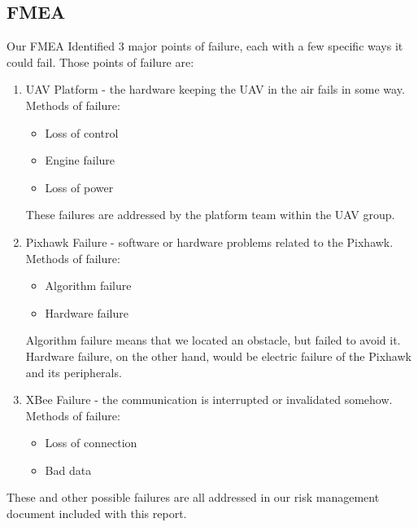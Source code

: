 \documentclass[12pt]{article}
\begin{document}
\subsection{FMEA}
Our FMEA Identified 3 major points of failure, each with a few specific ways it could fail. Those points of failure are:
\begin{enumerate}
\item UAV Platform - the hardware keeping the UAV in the air fails in some way. Methods of failure:
  \begin{itemize}
  \item Loss of control
  \item Engine failure
  \item Loss of power
  \end{itemize}
These failures are addressed by the platform team within the UAV group.
\item Pixhawk Failure - software or hardware problems related to the Pixhawk. Methods of failure:
  \begin{itemize}
  \item Algorithm failure
  \item Hardware failure
  \end{itemize}
  Algorithm failure means that we located an obstacle, but failed to avoid it. Hardware failure, on the other hand, would be electric failure of the Pixhawk and its peripherals.
\item XBee Failure - the communication is interrupted or invalidated somehow. Methods of failure:
  \begin{itemize}
  \item Loss of connection
  \item Bad data
  \end{itemize}
\end{enumerate}
These and other possible failures are all addressed in our risk management document included with this report.
\end{document}
